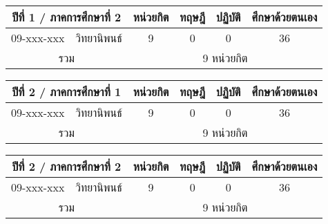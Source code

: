 \vspace{5ex}\par\noindent 
\begin{tabular}{|cp{}|cccc|}
\hline
\multicolumn{2}{|c|}{ปีที่ 1 / ภาคการศึกษาที่ 2} & \multicolumn{1}{c|}{หน่วยกิต} & \multicolumn{1}{c|}{ทฤษฎี} & \multicolumn{1}{c|}{ปฏิบัติ} & ศึกษาด้วยตนเอง \\ \hline
\multicolumn{1}{|c|}{09-xxx-xxx}  & วิทยานิพนธ์  & \multicolumn{1}{c|}{9}        & \multicolumn{1}{c|}{0}     & \multicolumn{1}{c|}{0}       & 36             \\ \hline
\multicolumn{2}{|c|}{รวม}                        & \multicolumn{4}{c|}{9 หน่วยกิต}                                                                            \\ \hline
\end{tabular}

\vspace{5ex}\par\noindent 
\begin{tabular}{|cp{}|cccc|}
\hline
\multicolumn{2}{|c|}{ปีที่ 2 / ภาคการศึกษาที่ 1} & \multicolumn{1}{c|}{หน่วยกิต} & \multicolumn{1}{c|}{ทฤษฎี} & \multicolumn{1}{c|}{ปฏิบัติ} & ศึกษาด้วยตนเอง \\ \hline
\multicolumn{1}{|c|}{09-xxx-xxx}  & วิทยานิพนธ์  & \multicolumn{1}{c|}{9}        & \multicolumn{1}{c|}{0}     & \multicolumn{1}{c|}{0}       & 36             \\ \hline
\multicolumn{2}{|c|}{รวม}                        & \multicolumn{4}{c|}{9 หน่วยกิต}                                                                            \\ \hline
\end{tabular}

\vspace{5ex}\par\noindent 
\begin{tabular}{|cp{}|cccc|}
\hline
\multicolumn{2}{|c|}{ปีที่ 2 / ภาคการศึกษาที่ 2} & \multicolumn{1}{c|}{หน่วยกิต} & \multicolumn{1}{c|}{ทฤษฎี} & \multicolumn{1}{c|}{ปฏิบัติ} & ศึกษาด้วยตนเอง \\ \hline
\multicolumn{1}{|c|}{09-xxx-xxx}  & วิทยานิพนธ์  & \multicolumn{1}{c|}{9}        & \multicolumn{1}{c|}{0}     & \multicolumn{1}{c|}{0}       & 36             \\ \hline
\multicolumn{2}{|c|}{รวม}                        & \multicolumn{4}{c|}{9 หน่วยกิต}                                                                            \\ \hline
\end{tabular}


